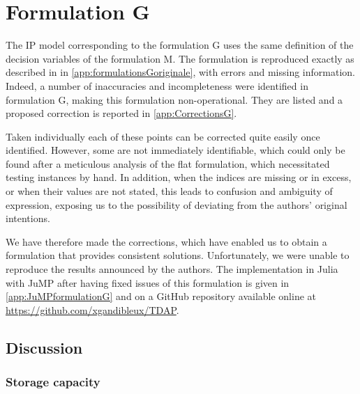 \documentclass[preprint,12pt,authoryear]{elsarticle}
\begin{document}
%
%
\section{Formulation G}\label{sec:FormulationG}

The IP model corresponding to the formulation G uses the same definition of the decision variables  of  the formulation M.
%
The formulation is reproduced exactly as  described in \citep{Gelareh2015,GELAREH2016,Gelareh2021} in  \ref{app:formulationsGoriginale}, with errors and missing information.
%
%
Indeed, a number of inaccuracies and incompleteness were identified in formulation G, making this formulation non-operational.
%
They are listed and a proposed correction is reported in \ref{app:CorrectionsG}.

Taken individually each of these points can be corrected quite easily once identified. 
%
However, some are not immediately identifiable, 
which could only be found after a meticulous analysis of the flat formulation, which necessitated testing instances by hand.
%
In addition, when the indices are missing or in excess, or when their values are not stated, this leads to confusion and ambiguity of expression, exposing us to the possibility of deviating from the authors' original intentions.

We have therefore made the corrections, which have enabled us to obtain a formulation that provides consistent solutions. 
Unfortunately, we were unable to reproduce the results announced by the authors.
%
The implementation  in Julia with JuMP after having fixed issues of this formulation is given in \ref{app:JuMPformulationG} and on a GitHub repository available online at \url{https://github.com/xgandibleux/TDAP}.    

%
%
\subsection{Discussion}\label{sec:discussionG}
\smallskip

%
%
\subsubsection{Storage capacity}
\end{document}
